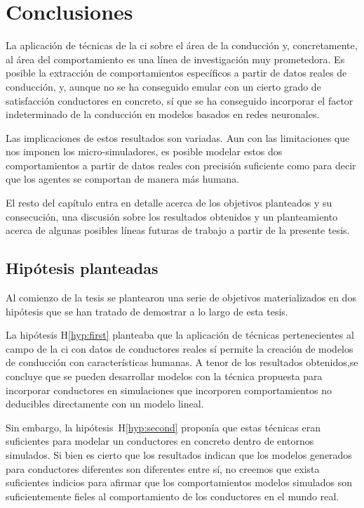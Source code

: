\chapter{Conclusiones}
\label{ch:conclusions}

La aplicación de técnicas de la \ac{ci} sobre el área de la conducción y, concretamente, al área del comportamiento es una línea de investigación muy prometedora. Es posible la extracción de comportamientos específicos a partir de datos reales de conducción, y, aunque no se ha conseguido emular con un cierto grado de satisfacción conductores en concreto, sí que se ha conseguido incorporar el factor indeterminado de la conducción en modelos basados en redes neuronales.

Las implicaciones de estos resultados son variadas. Aun con las limitaciones que nos imponen los micro-simuladores, es posible modelar estos dos comportamientos a partir de datos reales con precisión suficiente como para decir que los agentes se comportan de manera más humana.

El resto del capítulo entra en detalle acerca de los objetivos planteados y su consecución, una discusión sobre los resultados obtenidos y un planteamiento acerca de algunas posibles líneas futuras de trabajo a partir de la presente tesis.

\section{Hipótesis planteadas}

Al comienzo de la tesis se plantearon una serie de objetivos materializados en dos hipótesis que se han tratado de demostrar a lo largo de esta tesis.

La hipótesis H\ref{hyp:first} planteaba que la aplicación de técnicas pertenecientes al campo de la \ac{ci} con datos de conductores reales sí permite la creación de modelos de conducción con características humanas. A tenor de los resultados obtenidos,se concluye que se pueden desarrollar modelos con la técnica propuesta para incorporar conductores en simulaciones que incorporen comportamientos no deducibles directamente con un modelo lineal.

Sin embargo, la hipótesis~H\ref{hyp:second} proponía que estas técnicas eran suficientes para modelar un conductores en concreto dentro de entornos simulados. Si bien es cierto que los resultados indican que los modelos generados para conductores diferentes son diferentes entre sí, no creemos que exista suficientes indicios para afirmar que los comportamientos modelos simulados son suficientemente fieles al comportamiento de los conductores en el mundo real.

